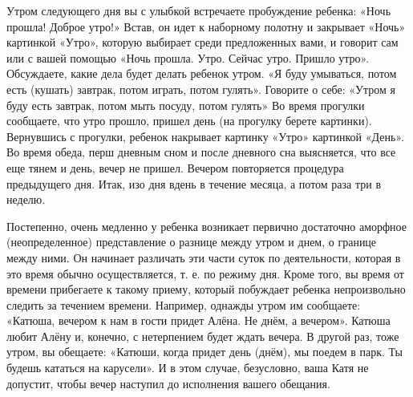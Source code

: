 \documentclass[a5paper]{book}
\begin{document}
Утром следующего дня вы с улыбкой встречаете пробуждение ребенка: «Ночь
прошла! Доброе утро!» Встав, он идет к наборному полотну и закрывает
«Ночь» картинкой «Утро», которую выбирает среди предложенных вами, и
говорит сам или с вашей помощью «Ночь прошла. Утро. Сейчас утро. Пришло
утро». Обсуждаете, какие дела будет делать ребенок утром. «Я буду
умываться, потом есть (кушать) завтрак, потом играть, потом гулять».
Говорите о себе: «Утром я буду есть завтрак, потом мыть посуду, потом
гулять» Во время прогулки сообщаете, что утро прошло, пришел день (на
прогулку берете картинки). Вернувшись с прогулки, ребенок накрывает
картинку «Утро» картинкой «День». Во время обеда, перш дневным сном и
после дневного сна выясняется, что все еще тянем и день, вечер не
пришел. Вечером повторяется процедура предыдущего дня. Итак, изо дня
вдень в течение месяца, а потом раза три в неделю.

Постепенно, очень медленно у ребенка возникает первично достаточно
аморфное (неопределенное) представление о разнице между утром и днем, о
границе между ними. Он начинает различать эти части суток по
деятельности, которая в это время обычно осуществляется, т. е. по режиму
дня. Кроме того, вы время от времени прибегаете к такому приему, который
побуждает ребенка непроизвольно следить за течением времени. Например,
однажды утром им сообщаете: «Катюша, вечером к нам в гости придет Алёна.
Не днём, а вечером». Катюша любит Алёну и, конечно, с нетерпением будет
ждать вечера. В другой раз, тоже утром, вы обещаете: «Катюши, когда
придет день (днём), мы поедем в парк. Ты будешь кататься на карусели». И
в этом случае, безусловно, ваша Катя не допустит, чтобы вечер наступил
до исполнения вашего обещания.
\end{document}
